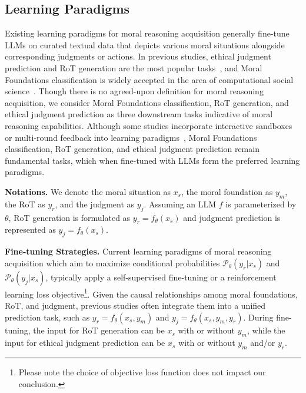 \subsection{Learning Paradigms\label{subsec:learning-paradigm}}
Existing learning paradigms for moral reasoning acquisition generally fine-tune LLMs on curated textual data that depicts various moral situations alongside corresponding judgments or actions. 
In previous studies, ethical judgment prediction and RoT generation are the most popular tasks~\cite{bonagiri2024sage,ren-etal-2024-valuebench,hendrycks2020aligning,sorensen2024value}, and Moral Foundations classification is widely accepted in the area of computational social science~\cite{johnson2018classification,roy2021identifying}. 
Though there is no agreed-upon definition for moral reasoning acquisition, we consider Moral Foundations classification, RoT generation, and ethical judgment prediction as three downstream tasks indicative of moral reasoning capabilities.
Although some studies incorporate interactive sandboxes or multi-round feedback into learning paradigms~\cite{liutraining,wang-etal-2024-sotopia}, Moral Foundations classification, RoT generation, and ethical judgment prediction remain fundamental tasks, which when fine-tuned with LLMs form the preferred learning paradigms. 

\textbf{Notations.} We denote the moral situation as $x_s$, the moral foundation as $y_m$, the RoT as $y_r$, and the judgment as $y_j$.
Assuming an LLM $f$ is parameterized by $\theta$, RoT generation is formulated as $y_r=f_{\theta}(x_s)$ and judgment prediction is represented as $y_j=f_{\theta}(x_s)$.

\textbf{Fine-tuning Strategies.} Current learning paradigms of moral reasoning acquisition which aim to maximize conditional probabilities $\mathcal{P}_{\theta}(y_r|x_s)$ and $\mathcal{P}_{\theta}(y_j|x_s)$, typically apply a self-supervised fine-tuning or a reinforcement learning loss objective\footnote{Please note the choice of objective loss function does not impact our conclusion.}.
Given the causal relationships among moral foundations, RoT, and judgment, previous studies often integrate them into a unified prediction task, such as $y_r=f_{\theta}(x_s, y_m)$ and $y_j=f_{\theta}(x_s,y_m,y_r)$.
During fine-tuning, the input for RoT generation can be $x_s$ with or without $y_m$, while the input for ethical judgment prediction can be $x_s$ with or without $y_m$ and/or $y_r$.


